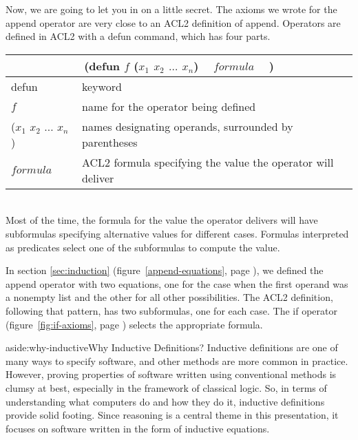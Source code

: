 Now, we are going to let you in on a little secret.
The axioms we wrote for the \textsf{append} operator are very
close to an ACL2 definition of \textsf{append}.
Operators are defined in ACL2 with a \textsf{defun} command,
which has four parts.
\vspace{2mm}

\begin{tabular}{ll}
\multicolumn{2}{c}{\textsf{(defun $f$ ($x_1$ $x_2$ $\dots$ $x_n$) ~ $formula$ ~ )}}\\
\hline
\textsf{defun}                       & keyword\\
$f$                                  & name for the operator being defined\\
\textsf{($x_1$ $x_2$ $\dots$ $x_n$)} & names designating operands, surrounded by parentheses\\
$formula$                            & ACL2 formula specifying the value the operator will deliver\\
\end{tabular}
\\

Most of the time, the formula for the value the operator delivers
will have subformulas specifying alternative values for different cases.
Formulas interpreted as predicates select one of
the subformulas to compute the value.

In section \ref{sec:induction} (figure~\ref{append-equations}, page \pageref{append-equations}),
we defined the \textsf{append} operator with two equations,
one for the case when the first operand was a nonempty list
and the other for all other possibilities.
The ACL2 definition, following that pattern, has two subformulas,
one for each case.
The \textsf{if} operator (figure~\ref{fig:if-axioms}, page \pageref{fig:if-axioms})
selects the appropriate formula.

\begin{aside}{aside:why-inductive}{Why Inductive Definitions?}
Inductive
definitions are one of many ways to specify software,
and other methods are more common in practice.
However, proving properties of software written using conventional methods
is clumsy at best, especially in the framework of classical logic.
So, in terms of understanding what computers do and how they do it,
inductive definitions provide solid footing.
Since reasoning is a central theme in this presentation,
it focuses on software written
in the form of inductive equations.
\end{aside}

